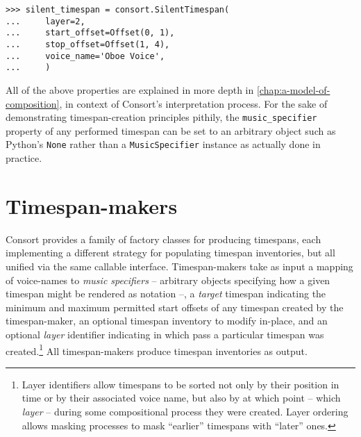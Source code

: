 \begin{abjadbookoutput}
\begin{singlespacing}
\vspace{-0.5\baselineskip}
\begin{verbatim}
>>> silent_timespan = consort.SilentTimespan(
...     layer=2,
...     start_offset=Offset(0, 1),
...     stop_offset=Offset(1, 4),
...     voice_name='Oboe Voice',
...     )
\end{verbatim}
\end{singlespacing}
\end{abjadbookoutput}

\noindent All of the above properties are explained in more depth in
\autoref{chap:a-model-of-composition}, in context of Consort's interpretation
process. For the sake of demonstrating timespan-creation principles pithily,
the \texttt{music\_specifier} property of any performed timespan can be set to
an arbitrary object such as Python's \texttt{None} rather than a
\texttt{MusicSpecifier} instance as actually done in practice.

\section{Timespan-makers}
\label{sec:timespan-makers}

Consort provides a family of factory classes for producing timespans, each
implementing a different strategy for populating timespan inventories, but all
unified via the same callable interface. Timespan-makers take as input a
mapping of voice-names to \emph{music specifiers} -- arbitrary objects
specifying how a given timespan might be rendered as notation --, a
\emph{target} timespan indicating the minimum and maximum permitted start
offsets of any timespan created by the timespan-maker, an optional timespan
inventory to modify in-place, and an optional \emph{layer} identifier
indicating in which pass a particular timespan was created.\footnote{Layer
identifiers allow timespans to be sorted not only by their position in time or
by their associated voice name, but also by at which point -- which
\emph{layer} -- during some compositional process they were created. Layer
ordering allows masking processes to mask \enquote{earlier} timespans with
\enquote{later} ones.} All timespan-makers produce timespan inventories as
output.


